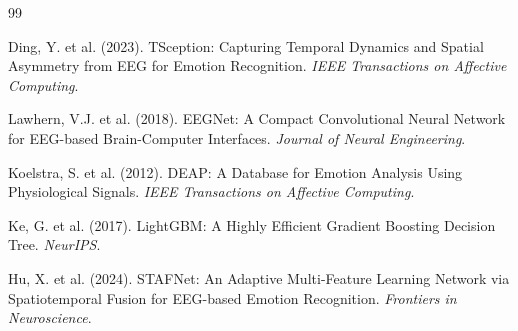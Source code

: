 \documentclass[UTF8,zihao=-4,fontset=fandol]{ctexart}
\numberwithin{equation}{section}
\numberwithin{figure}{section}
\numberwithin{table}{section}
\begin{document}
\begin{thebibliography}{99}

Ding, Y. et al. (2023). TSception: Capturing Temporal Dynamics and Spatial Asymmetry from EEG for Emotion Recognition. \textit{IEEE Transactions on Affective Computing}.

Lawhern, V.J. et al. (2018). EEGNet: A Compact Convolutional Neural Network for EEG-based Brain-Computer Interfaces. \textit{Journal of Neural Engineering}.

Koelstra, S. et al. (2012). DEAP: A Database for Emotion Analysis Using Physiological Signals. \textit{IEEE Transactions on Affective Computing}.

Ke, G. et al. (2017). LightGBM: A Highly Efficient Gradient Boosting Decision Tree. \textit{NeurIPS}.

Hu, X. et al. (2024). STAFNet: An Adaptive Multi-Feature Learning Network via Spatiotemporal Fusion for EEG-based Emotion Recognition. \textit{Frontiers in Neuroscience}.

\end{thebibliography}
\end{document}
